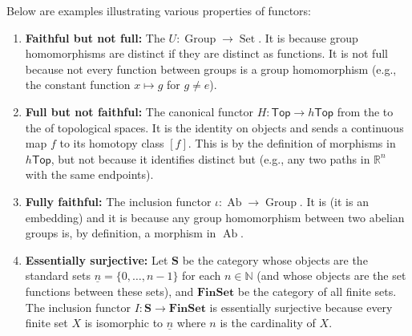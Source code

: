 \begin{example} \label{example:properties_of_functors}
    Below are examples illustrating various properties of functors:
    \begin{enumerate}
        \item \textbf{Faithful but not full:} The  $U: \operatorname{Group} \to \operatorname{Set}$. It is  because group homomorphisms are distinct if they are distinct as functions. It is not full because not every function between groups is a group homomorphism (e.g., the constant function $x \mapsto g$ for $g \neq e$).

        \item \textbf{Full but not faithful:} The canonical functor $H: \mathsf{Top} \to h\mathsf{Top}$ from the  to the  of topological spaces. It is the identity on objects and sends a continuous map $f$ to its homotopy class $[f]$. This is  by the definition of morphisms in $h\mathsf{Top}$, but not  because it identifies distinct but  (e.g., any two paths in $\mathbb{R}^n$ with the same endpoints).

        \item \textbf{Fully faithful:} The inclusion functor $\iota: \operatorname{Ab} \to \operatorname{Group}$. It is  (it is an embedding) and it is  because any group homomorphism between two abelian groups is, by definition, a morphism in $\operatorname{Ab}$.

        \item \textbf{Essentially surjective:} Let $\mathbf{S}$ be the category whose objects are the standard sets $\underline{n} = \{0, \dots, n-1\}$ for each $n \in \mathbb{N}$ (and whose objects are the set functions between these sets), and $\mathbf{FinSet}$ be the category of all finite sets. The inclusion functor $I: \mathbf{S} \to \mathbf{FinSet}$ is essentially surjective because every finite set $X$ is isomorphic to $\underline{n}$ where $n$ is the cardinality of $X$.


\end{enumerate}
\end{example}
